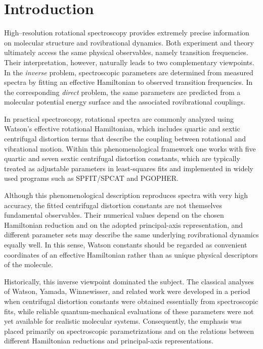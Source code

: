 \section{Introduction}

High--resolution rotational spectroscopy provides extremely precise
information on molecular structure and rovibrational dynamics.
\cite{TownesSchawlow1955,GordyCook1984,BunkerJensen2005}
Both experiment and theory ultimately access the same physical
observables, namely transition frequencies. Their interpretation,
however, naturally leads to two complementary viewpoints.
In the \emph{inverse} problem, spectroscopic parameters are determined
from measured spectra by fitting an effective Hamiltonian to observed
transition frequencies.\cite{GordyCook1984,TownesSchawlow1955}
In the corresponding \emph{direct} problem, the same parameters are
predicted from a molecular potential energy surface and the associated
rovibrational couplings.\cite{Dinu2022}

In practical spectroscopy, rotational spectra are commonly analyzed
using Watson's effective rotational Hamiltonian,\cite{Watson1968,Watson1977}
which includes quartic and sextic centrifugal distortion terms that
describe the coupling between rotational and vibrational motion.
Within this phenomenological framework one works with five quartic and
seven sextic centrifugal distortion constants, which are typically
treated as adjustable parameters in least-squares fits and implemented
in widely used programs such as SPFIT/SPCAT and PGOPHER.\cite{Pickett1991,Western2017}

Although this phenomenological description reproduces spectra with very
high accuracy, the fitted centrifugal distortion constants are not
themselves fundamental observables. Their numerical values depend on
the chosen Hamiltonian reduction and on the adopted principal-axis
representation, and different parameter sets may describe the same
underlying rovibrational dynamics equally well. In this sense, Watson
constants should be regarded as convenient coordinates of an effective
Hamiltonian rather than as unique physical descriptors of the molecule.

Historically, this inverse viewpoint dominated the subject. The
classical analyses of Watson, Yamada, Winnewisser, and related work
were developed in a period when centrifugal distortion constants were
obtained essentially from spectroscopic fits, while reliable
quantum-mechanical evaluations of these parameters were not yet
available for realistic molecular systems. Consequently, the emphasis
was placed primarily on spectroscopic parametrizations and on the
relations between different Hamiltonian reductions and principal-axis
representations.

